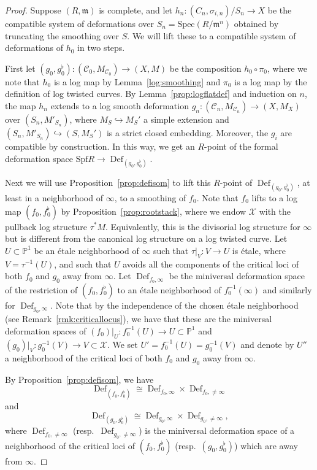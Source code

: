 \documentclass[11pt]{amsart}
\numberwithin{equation}{section}
\theoremstyle{definition}
\theoremstyle{remark}
\DeclareMathOperator{\Def}{Def}
\newcommand{\calX}{\mathcal X}
\newcommand{\calC}{\mathcal C}
\newcommand{\Spec}{\mathrm{Spec}}
\newcommand{\Spf}{\mathrm{Spf}}
\begin{document}
\begin{proof}
Suppose $(R,\mathfrak{m})$ is complete, and let $h_n\colon  (C_n, \sigma_{i,n})/S_n \to X$ be the compatible system of deformations over $S_n = \Spec (R/\mathfrak{m}^n)$ obtained by truncating the smoothing over $S$. We will lift these to a compatible system of deformations of $h_0$ in two steps.

First let $(g_0, g_0^\flat) \colon  (\calC_0, M_{\calC_0}) \to (X, M)$ be the composition $h_0 \circ \pi_0$, where we note that $h_0$ is a log map by Lemma~\ref{log:smoothing} and $\pi_0$ is a log map by the definition of log twisted curves. By Lemma~\ref{prop:logflatdef} and induction on $n$, the map $h_n$ extends to a log smooth deformation $g_n \colon  (\calC_n, M_{\calC_n}) \to (X, M_X)$ over $(S_n, M'_{S_n})$, where $M_S \hookrightarrow M_S'$ a simple extension and $(S_n, M'_{S_n}) \hookrightarrow (S, M_S')$ is a strict closed embedding. Moreover, the $g_i$ are compatible by construction. In this way, we get an $R$-point of the formal deformation space $\Spf R \to \Def_{(g_0, g_0^\flat)}$.  

Next we will use Proposition~\ref{prop:defisom} to lift this $R$-point of $\Def_{(g_0, g_0^\flat)}$, at least in a neighborhood of $\infty$, to a smoothing of $f_0$. Note that $f_0$ lifts to a log map $(f_0, f_0^\flat)$ by Proposition~\ref{prop:rootstack}, where we endow $\calX$ with the pullback log structure $\tau^*M$. Equivalently, this is the divisorial log structure for $\infty$ but is different from the canonical log structure on a log twisted curve. Let $U \subset \mathbb{P}^1$ be an \'etale neighborhood of $\infty$ such that $\tau|_V \colon  V \to U$ is \'etale, where $V = \tau^{-1}(U)$, and such that $U$ avoids all the components of the critical loci of both $f_0$ and $g_0$ away from $\infty$. Let $\Def_{f_0, \infty}$ be the miniversal deformation space of the restriction of $(f_0, f_0^\flat)$ to an \'etale neighborhood of $f_0^{-1}(\infty)$ and similarly for $\Def_{g_0, \infty}$. Note that by the independence of the chosen \'etale neighborhood (see Remark~\ref{rmk:criticallocus}), we have that these are the miniversal deformation spaces of $(f_0)|_{U} \colon  f_0^{-1}(U) \to U \subset \mathbb{P}^1$ and $(g_0)|_{V} \colon  g_0^{-1}(V) \to V \subset \calX$. We set $U' = f_0^{-1}(U) = g_0^{-1}(V)$ and denote by $U''$ a neighborhood of the critical loci of both $f_0$ and $g_0$ away from $\infty$.

By Proposition~\ref{prop:defisom}, we have
$$
\Def_{(f_0, f_0^\flat)} \cong \Def_{f_0, \infty} \times \Def_{f_0, \neq \infty}
$$
and
$$
\Def_{(g_0, g_0^\flat)} \cong \Def_{g_0, \infty} \times \Def_{g_0, \neq \infty}, 
$$
where $\Def_{f_0, \neq \infty}$ (resp.\ $\Def_{g_0, \neq \infty}$) is the miniversal deformation space of a neighborhood of the critical loci of $(f_0,f_0^\flat)$ (resp.\ $(g_0, g_0^\flat)$) which are away from $\infty$. 




\end{proof}
\end{document}
